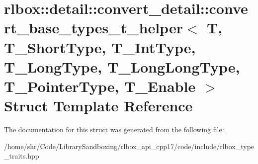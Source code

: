 \hypertarget{structrlbox_1_1detail_1_1convert__detail_1_1convert__base__types__t__helper}{}\section{rlbox\+:\+:detail\+:\+:convert\+\_\+detail\+:\+:convert\+\_\+base\+\_\+types\+\_\+t\+\_\+helper$<$ T, T\+\_\+\+Short\+Type, T\+\_\+\+Int\+Type, T\+\_\+\+Long\+Type, T\+\_\+\+Long\+Long\+Type, T\+\_\+\+Pointer\+Type, T\+\_\+\+Enable $>$ Struct Template Reference}
\label{structrlbox_1_1detail_1_1convert__detail_1_1convert__base__types__t__helper}


The documentation for this struct was generated from the following file\+:\begin{DoxyCompactItemize}
\item 
/home/shr/\+Code/\+Library\+Sandboxing/rlbox\+\_\+api\+\_\+cpp17/code/include/rlbox\+\_\+type\+\_\+traits.\+hpp\end{DoxyCompactItemize}

